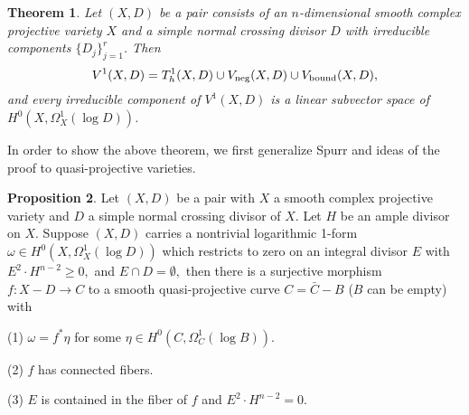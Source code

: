 \documentclass[a4paper,12pt,reqno]{amsart}
\newtheorem{theorem}{Theorem}[section]
\theoremstyle{plain}
\theoremstyle{definition}
\newtheorem{proposition}[theorem]{Proposition}
\theoremstyle{remark}
\begin{document}
\begin{theorem} \label{thm:codim1quasiprojective} Let $(X, D)$ be a pair consists of an $n$-dimensional smooth complex projective variety $X$ and a simple normal crossing divisor $D$ with irreducible components $\{D_j\}_{j=1}^r$. Then 
$$
V^1(X,D)= T^1_h(X, D) \cup V_{\textnormal{neg}}(X, D) \cup V_{\textnormal{bound}}(X, D),
$$
and every irreducible component of $V^1(X,D)$ is a linear subvector space of $H^0(X, \Omega_X^1(\log D))$. 
\end{theorem}

In order to show the above theorem, we first generalize Spurr \cite[Theorem 2]{Sp88} and ideas of the proof to quasi-projective varieties. 

\begin{proposition} \label{Prop:Spurr-no-intersection}
Let $(X, D)$ be a pair with $X$ a smooth complex projective variety and $D$ a simple normal crossing divisor of $X$. Let $H$ be an ample divisor on $X$. Suppose $(X, D)$ carries a nontrivial logarithmic 1-form $\omega\in H^0(X, \Omega_X^1(\log D))$  which restricts to zero on an integral divisor $E$ with $E^2\cdot H^{n-2}\geq0,$ and $E\cap D=\emptyset,$ then there is a surjective morphism $f: X-D\to C$ to a smooth quasi-projective curve $C=\bar{C}-B$ ($B$ can be empty) with 

(1)  $\omega=f^*\eta$ for some $\eta\in H^0(C, \Omega_C^1(\log B))$.

(2) $f$ has connected fibers.

(3) $E$ is contained in the fiber of $f$ and $E^2\cdot H^{n-2}=0$.
\end{proposition}
\end{document}
